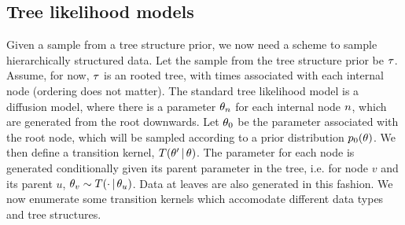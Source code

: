 \subsection{Tree likelihood models}

Given a sample from a tree structure prior, 
we now need a scheme to sample
hierarchically structured data.
Let the sample from the tree
structure prior be $\tau$.
Assume, for now, $\tau$ is
an rooted tree,
with times associated with each internal node (ordering does not matter).
The standard tree likelihood model is a diffusion model,
where there is a parameter $\theta_n$ for each internal
node $n$, which are generated from the root downwards.
Let $\theta_0$ be the parameter associated with the root node,
which will be sampled according to a prior distribution $p_0(\theta)$.
We then define a transition kernel, $T(\theta' \,|\, \theta)$.
The parameter for each node is generated conditionally
given its parent parameter in the tree,
i.e. for node $v$ and its parent $u$,
$\theta_v \sim T(\cdot \,|\, \theta_u)$.
Data at leaves are also generated in this fashion.
We now enumerate some transition kernels
which accomodate different data types and tree structures.

